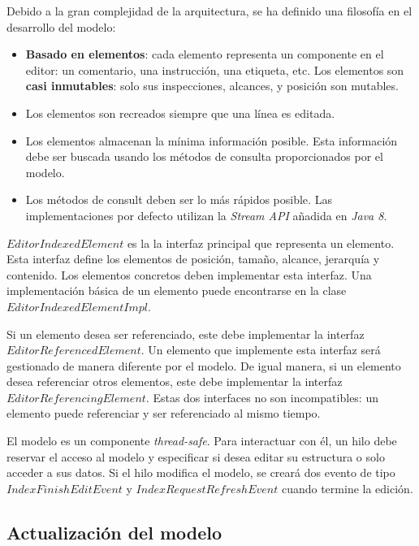 Debido a la gran complejidad de la arquitectura,
se ha definido una filosofía en el desarrollo
del modelo:
\begin{itemize}
    \item \textbf{Basado en elementos}: cada elemento representa
    un componente en el editor: un comentario, una instrucción,
    una etiqueta, etc.
    Los elementos son \textbf{casi inmutables}:
    solo sus inspecciones, alcances, y posición son mutables.
    \item Los elementos son recreados siempre que una línea
    es editada.
    \item Los elementos almacenan la mínima información
    posible.
    Esta información debe ser buscada usando los métodos
    de consulta proporcionados por el modelo.
    \item Los métodos de consult deben ser lo más rápidos
    posible.
    Las implementaciones por defecto utilizan la
    \textit{Stream API}\cite{STREAM_API} añadida en \textit{Java 8}.
\end{itemize}

\noindent $EditorIndexedElement$ es la la interfaz principal
que representa un elemento.
Esta interfaz define los elementos de posición, tamaño, alcance,
jerarquía y contenido.
Los elementos concretos deben implementar esta interfaz.
Una implementación básica de un elemento puede encontrarse
en la clase $EditorIndexedElementImpl$.

\noindent Si un elemento desea ser referenciado, este debe
implementar la interfaz $EditorReferencedElement$.
Un elemento que implemente esta interfaz será gestionado
de manera diferente por el modelo.
De igual manera, si un elemento desea referenciar
otros elementos, este debe implementar la interfaz
$EditorReferencingElement$.
Estas dos interfaces no son incompatibles:
un elemento puede referenciar y ser referenciado
al mismo tiempo.

\noindent El modelo es un componente \textit{thread-safe}.
Para interactuar con él, un hilo debe reservar el acceso
al modelo y especificar si desea editar su estructura o
solo acceder a sus datos.
Si el hilo modifica el modelo, se creará dos evento de tipo
$IndexFinishEditEvent$ y $IndexRequestRefreshEvent$
cuando termine la edición.

\subsection{Actualización del modelo}\label{subsec:actualizacion-del-modelo}

